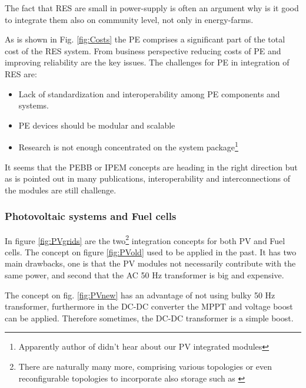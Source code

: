 \documentclass[]{scrartcl}
\begin{document}
The fact that RES are small in power-supply is often an argument why is it good to integrate them also on community level, not only in energy-farms. 

As is shown in Fig. \ref{fig:Costs} the PE comprises a significant part of the total cost of the RES system. From business perspective reducing costs of PE and improving reliability are the key issues. The challenges for PE in integration of RES are\cite{Chakraborty2009}:

\begin{itemize}
	\item Lack of standardization and interoperability among PE components and systems. 
	\item PE devices should be modular and scalable
	\item Research is not enough concentrated on the system package\footnote{Apparently author of \cite{Chakraborty2009} didn't hear about our PV integrated modules}
\end{itemize}

It seems that the PEBB or IPEM concepts are heading in the right direction but as is pointed out in many publications, interoperability and interconnections of the modules are still challenge.

\subsubsection{Photovoltaic systems and Fuel cells}
In figure \ref{fig:PVgrids} are the two\footnote{There are naturally many more, comprising various topologies or even reconfigurable topologies to incorporate also storage such as \cite{Kim2013}} integration concepts for both PV and Fuel cells. The concept on figure \ref{fig:PVold} used to be applied in the past. It has two main drawbacks, one is that the PV modules not necessarily contribute with the same power, and second that the AC 50 Hz transformer is big and expensive. 

The concept on fig. \ref{fig:PVnew} has an advantage of not using bulky 50 Hz transformer, furthermore in the DC-DC converter the MPPT and voltage boost can be applied. Therefore sometimes, the DC-DC transformer is a simple boost. 
\end{document}
